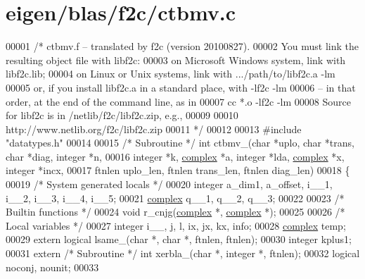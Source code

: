 \hypertarget{eigen_2blas_2f2c_2ctbmv_8c_source}{}\section{eigen/blas/f2c/ctbmv.c}
\label{eigen_2blas_2f2c_2ctbmv_8c_source}

\begin{DoxyCode}
00001 \textcolor{comment}{/* ctbmv.f -- translated by f2c (version 20100827).}
00002 \textcolor{comment}{   You must link the resulting object file with libf2c:}
00003 \textcolor{comment}{    on Microsoft Windows system, link with libf2c.lib;}
00004 \textcolor{comment}{    on Linux or Unix systems, link with .../path/to/libf2c.a -lm}
00005 \textcolor{comment}{    or, if you install libf2c.a in a standard place, with -lf2c -lm}
00006 \textcolor{comment}{    -- in that order, at the end of the command line, as in}
00007 \textcolor{comment}{        cc *.o -lf2c -lm}
00008 \textcolor{comment}{    Source for libf2c is in /netlib/f2c/libf2c.zip, e.g.,}
00009 \textcolor{comment}{}
00010 \textcolor{comment}{        http://www.netlib.org/f2c/libf2c.zip}
00011 \textcolor{comment}{*/}
00012 
00013 \textcolor{preprocessor}{#include "datatypes.h"}
00014 
00015 \textcolor{comment}{/* Subroutine */} \textcolor{keywordtype}{int} ctbmv\_(\textcolor{keywordtype}{char} *uplo, \textcolor{keywordtype}{char} *trans, \textcolor{keywordtype}{char} *diag, integer *n, 
00016     integer *k, \hyperlink{structcomplex}{complex} *a, integer *lda, \hyperlink{structcomplex}{complex} *x, integer *incx, 
00017     ftnlen uplo\_len, ftnlen trans\_len, ftnlen diag\_len)
00018 \{
00019     \textcolor{comment}{/* System generated locals */}
00020     integer a\_dim1, a\_offset, i\_\_1, i\_\_2, i\_\_3, i\_\_4, i\_\_5;
00021     \hyperlink{structcomplex}{complex} q\_\_1, q\_\_2, q\_\_3;
00022 
00023     \textcolor{comment}{/* Builtin functions */}
00024     \textcolor{keywordtype}{void} r\_cnjg(\hyperlink{structcomplex}{complex} *, \hyperlink{structcomplex}{complex} *);
00025 
00026     \textcolor{comment}{/* Local variables */}
00027     integer i\_\_, j, l, ix, jx, kx, info;
00028     \hyperlink{structcomplex}{complex} temp;
00029     \textcolor{keyword}{extern} logical lsame\_(\textcolor{keywordtype}{char} *, \textcolor{keywordtype}{char} *, ftnlen, ftnlen);
00030     integer kplus1;
00031     \textcolor{keyword}{extern} \textcolor{comment}{/* Subroutine */} \textcolor{keywordtype}{int} xerbla\_(\textcolor{keywordtype}{char} *, integer *, ftnlen);
00032     logical noconj, nounit;
00033 

\end{DoxyCode}

